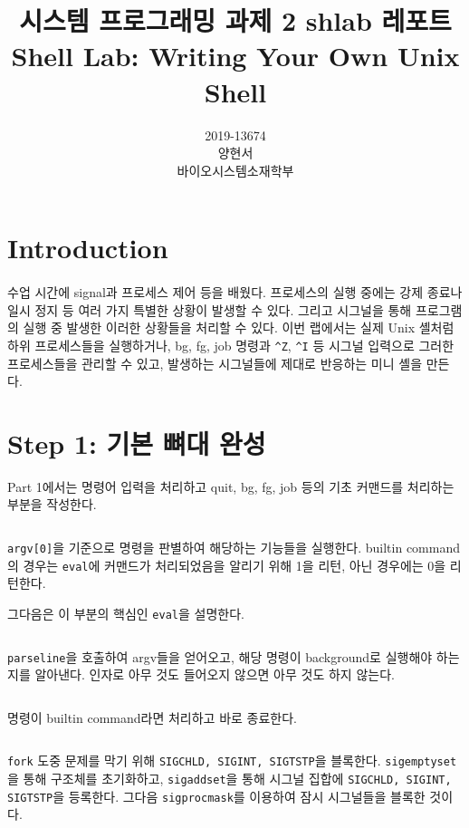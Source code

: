 \documentclass{report}
\title{시스템 프로그래밍 과제 2 shlab 레포트 \\
\large Shell Lab: Writing Your Own Unix Shell}
\date{}
\author{
  2019-13674\\
  양현서 \\
  바이오시스템소재학부\\
}
\begin{document}
\maketitle
\tableofcontents

\section{Introduction}
\paragraph{}
 수업 시간에 signal과 프로세스 제어 등을 배웠다. 프로세스의 실행 중에는 강제 종료나 일시 정지 등 여러 가지 특별한 상황이 발생할 수 있다. 그리고 시그널을 통해 프로그램의 실행 중 발생한 이러한 상황들을 처리할 수 있다. 이번 랩에서는 실제 Unix 셸처럼 하위 프로세스들을 실행하거나, bg, fg, job 명령과 \lstinline{^Z}, \lstinline{^I} 등 시그널 입력으로 그러한 프로세스들을 관리할 수 있고, 발생하는 시그널들에 제대로 반응하는 미니 셸을 만든다.

\section{Step 1: 기본 뼈대 완성}
Part 1에서는 명령어 입력을 처리하고 quit, bg, fg, job 등의 기초 커맨드를 처리하는 부분을 작성한다.
\inputminted[firstline=293,lastline=306, linenos]{C}{../shlab/tsh.c}
\lstinline{argv[0]}을 기준으로 명령을 판별하여 해당하는 기능들을 실행한다. builtin command의 경우는 \lstinline{eval}에 커맨드가 처리되었음을 알리기 위해 1을 리턴, 아닌 경우에는 0을 리턴한다.

그다음은 이 부분의 핵심인 \lstinline{eval}을 설명한다.

\inputminted[firstline=167,lastline=174, linenos]{C}{../shlab/tsh.c}
\lstinline{parseline}을 호출하여 argv들을 얻어오고, 해당 명령이 background로 실행해야 하는지를 알아낸다.
인자로 아무 것도 들어오지 않으면 아무 것도 하지 않는다.

\inputminted[firstline=175,lastline=178, linenos]{C}{../shlab/tsh.c}

명령이 builtin command라면 처리하고 바로 종료한다.

\inputminted[firstline=179,lastline=196, linenos]{C}{../shlab/tsh.c}
\lstinline{fork} 도중 문제를 막기 위해 \lstinline{SIGCHLD, SIGINT, SIGTSTP}을 블록한다. \lstinline{sigemptyset}을 통해 구조체를 초기화하고, \lstinline{sigaddset}을 통해 시그널 집합에 \lstinline{SIGCHLD, SIGINT, SIGTSTP}을 등록한다. 그다음 \lstinline{sigprocmask}를 이용하여 잠시 시그널들을 블록한 것이다.
\end{document}
